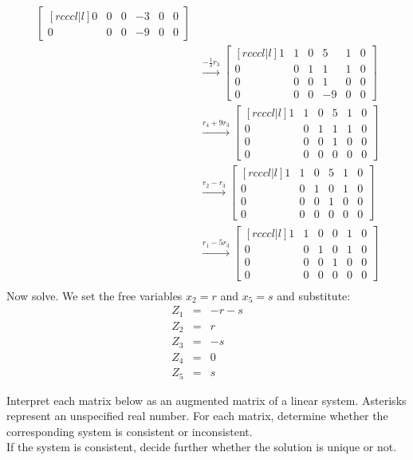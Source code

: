 \begin{solution}
\begin{eqnarray*}
\begin{bmatrix}[rcccl|l]
0&0&0&-3&0&0\\
0&0&0&-9&0&0
\end{bmatrix}\\
&\xrightarrow[]{-\frac{1}{3}r_3}
\begin{bmatrix}[rcccl|l]
1&1&0&5&1&0\\
0&0&1&1&1&0\\
0&0&0&1&0&0\\
0&0&0&-9&0&0
\end{bmatrix}\\
&\xrightarrow[]{r_4+9r_3}
\begin{bmatrix}[rcccl|l]
1&1&0&5&1&0\\
0&0&1&1&1&0\\
0&0&0&1&0&0\\
0&0&0&0&0&0
\end{bmatrix}\\
&\xrightarrow[]{r_2-r_3}
\begin{bmatrix}[rcccl|l]
1&1&0&5&1&0\\
0&0&1&0&1&0\\
0&0&0&1&0&0\\
0&0&0&0&0&0
\end{bmatrix}\\
&\xrightarrow[]{r_1-5r_3}
\begin{bmatrix}[rcccl|l]
1&1&0&0&1&0\\
0&0&1&0&1&0\\
0&0&0&1&0&0\\
0&0&0&0&0&0
\end{bmatrix}\\
\end{eqnarray*}
Now solve. We set the free variables $x_2=r$ and $x_5 = s$ and substitute: 
\begin{eqnarray*}
Z_1&=&-r-s \\
Z_2&=&r \\
Z_3&=&-s \\
Z_4&=&0 \\
Z_5&=&s
\end{eqnarray*}
\end{solution}
\ii
Interpret each matrix below as an augmented matrix of a linear system. Asterisks represent an unspecified real number. For each matrix, determine whether the corresponding system is consistent or inconsistent. 
\vspace{.1in}
\\
If the system is consistent, decide further whether the solution is unique or not. 
\vspace{.1in}
\\
